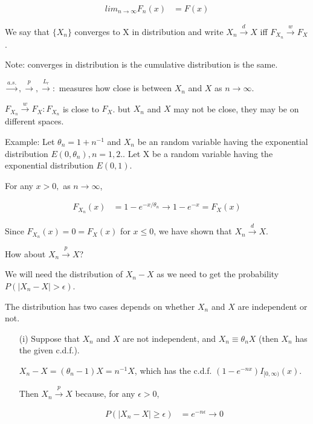 \begin{itemize}
\begin{align*}
	lim_{n \rightarrow \infty} F_n(x) &= F(x)
\end{align*}

We say that $\{ X_n \}$ converges to X in distribution and write $X_n \xrightarrow {d} X$ iff $F_{X_n} \xrightarrow {w} F_X$. 

Note: converges in distribution is the cumulative distribution is the same.



$\xrightarrow {a.s.}, \xrightarrow {p}, \xrightarrow {L_r}: $ measures how close is between $X_n$ and $X$ as $n \rightarrow \infty$. 

$F_{X_n} \xrightarrow {w} F_{X}: F_{X_n}$ is close to $F_X$. but $X_n$ and $X$ may not be close, they may be on different spaces.


Example: Let $\theta_n = 1 + n^{-1}$ and $X_n$ be an random variable having the exponential distribution $E(0, \theta_n), n=1,2..$
Let X be a random variable having the exponential distribution $E(0,1)$. 

For any $x>0,$ as $n \rightarrow \infty$,

\begin{align*}
	F_{X_n}(x) &= 1 - e^{-x/\theta_n} \rightarrow 1- e^{-x} = F_X(x)
\end{align*}

Since $F_{X_n}(x) = 0 = F_X(x)$ for $x \leq 0$, we have shown that $X_n \xrightarrow {d} X$.

How about $X_n \xrightarrow {p} X$?

We will need the distribution of $X_n -X$ as we need to get the probability $P(|X_n - X|> \epsilon )$.

The distribution has two cases depends on whether $X_n$ and $X$ are independent or not. 

\begin{itemize}
\item[(i)] Suppose that $X_n$ and $X$ are not independent, and $X_n \equiv \theta_n X$ (then $X_n$ has the given c.d.f.).

$X_n - X = (\theta_n -1) X = n^{-1} X$, which has the c.d.f. $(1- e^{-nx})I_{[0, \infty)} (x)$. 

Then $X_n \xrightarrow {p} X$ because, for any $\epsilon > 0$, 
 
 \begin{align*}
	P(| X_n -X | \geq \epsilon) &= e^{-n\epsilon} \rightarrow 0
\end{align*}


\end{itemize}
\end{itemize}
